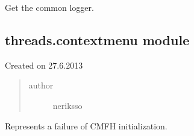 \documentclass[letterpaper,10pt,english]{sphinxmanual}
\begin{document}

\begin{fulllineitems}
\label{threads:threads.connectionerror.logger}
Get the common logger.

\end{fulllineitems}



\subsection{threads.contextmenu module}
\label{threads:module-threads.contextmenu}\label{threads:threads-contextmenu-module}
Created on 27.6.2013
\begin{quote}\begin{description}
\item[{author}] \leavevmode
neriksso

\end{description}\end{quote}

\begin{fulllineitems}
\label{threads:threads.contextmenu.ContextMenuFailure}
Represents a failure of CMFH initialization.

\end{fulllineitems}

\end{document}
